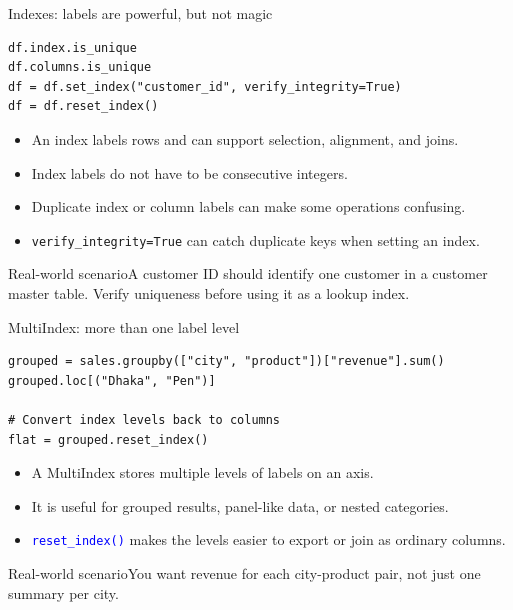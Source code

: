 \documentclass[aspectratio=169,10pt]{beamer}
\newcommand{\scenario}[1]{\begin{block}{Real-world scenario}#1\end{block}}
\newcommand{\method}[1]{\texttt{\textcolor{Blue}{#1}}}
\begin{document}
\begin{frame}[fragile]{Indexes: labels are powerful, but not magic}
\begin{lstlisting}
df.index.is_unique
df.columns.is_unique
df = df.set_index("customer_id", verify_integrity=True)
df = df.reset_index()
\end{lstlisting}
\begin{itemize}
\item An index labels rows and can support selection, alignment, and joins.
\item Index labels do not have to be consecutive integers.
\item Duplicate index or column labels can make some operations confusing.
\item \texttt{verify\_integrity=True} can catch duplicate keys when setting an index.
\end{itemize}
\scenario{A customer ID should identify one customer in a customer master table. Verify uniqueness before using it as a lookup index.}
\end{frame}

\begin{frame}[fragile]{MultiIndex: more than one label level}
\begin{lstlisting}
grouped = sales.groupby(["city", "product"])["revenue"].sum()
grouped.loc[("Dhaka", "Pen")]

# Convert index levels back to columns
flat = grouped.reset_index()
\end{lstlisting}
\begin{itemize}
\item A MultiIndex stores multiple levels of labels on an axis.
\item It is useful for grouped results, panel-like data, or nested categories.
\item \method{reset\_index()} makes the levels easier to export or join as ordinary columns.
\end{itemize}
\scenario{You want revenue for each city-product pair, not just one summary per city.}
\end{frame}
\end{document}

